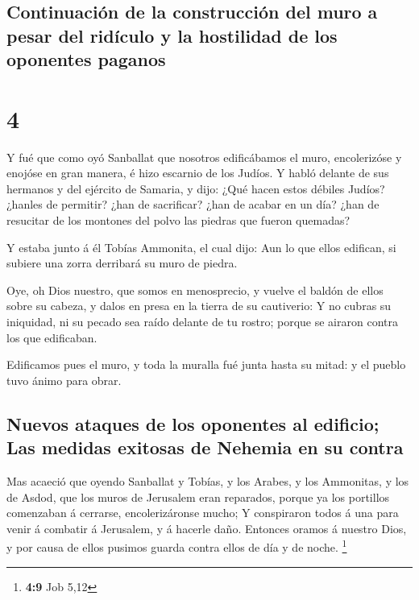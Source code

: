 \hypertarget{continuaciuxf3n-de-la-construcciuxf3n-del-muro-a-pesar-del-riduxedculo-y-la-hostilidad-de-los-oponentes-paganos}{%
\subsection{Continuación de la construcción del muro a pesar del
ridículo y la hostilidad de los oponentes
paganos}\label{continuaciuxf3n-de-la-construcciuxf3n-del-muro-a-pesar-del-riduxedculo-y-la-hostilidad-de-los-oponentes-paganos}}

\hypertarget{section-3}{%
\section{4}\label{section-3}}

 Y fué que como oyó Sanballat que nosotros edificábamos el
muro, encolerizóse y enojóse en gran manera, é hizo escarnio de los
Judíos.  Y habló delante de sus hermanos y del ejército de
Samaria, y dijo: ¿Qué hacen estos débiles Judíos? ¿hanles de permitir?
¿han de sacrificar? ¿han de acabar en un día? ¿han de resucitar de los
montones del polvo las piedras que fueron quemadas?

 Y estaba junto á él Tobías Ammonita, el cual dijo: Aun lo
que ellos edifican, si subiere una zorra derribará su muro de piedra.

 Oye, oh Dios nuestro, que somos en menosprecio, y vuelve
el baldón de ellos sobre su cabeza, y dalos en presa en la tierra de su
cautiverio:  Y no cubras su iniquidad, ni su pecado sea
raído delante de tu rostro; porque se airaron contra los que edificaban.

 Edificamos pues el muro, y toda la muralla fué junta
hasta su mitad: y el pueblo tuvo ánimo para obrar.

\hypertarget{nuevos-ataques-de-los-oponentes-al-edificio-las-medidas-exitosas-de-nehemia-en-su-contra}{%
\subsection{Nuevos ataques de los oponentes al edificio; Las medidas
exitosas de Nehemia en su
contra}\label{nuevos-ataques-de-los-oponentes-al-edificio-las-medidas-exitosas-de-nehemia-en-su-contra}}

 Mas acaeció que oyendo Sanballat y Tobías, y los Arabes,
y los Ammonitas, y los de Asdod, que los muros de Jerusalem eran
reparados, porque ya los portillos comenzaban á cerrarse,
encolerizáronse mucho;  Y conspiraron todos á una para
venir á combatir á Jerusalem, y á hacerle daño.  Entonces
oramos á nuestro Dios, y por causa de ellos pusimos guarda contra ellos
de día y de noche. \footnote{\textbf{4:9} Job 5,12}

